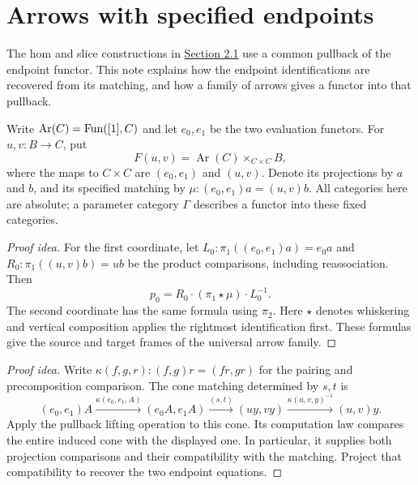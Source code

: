 \documentclass[11pt]{article}
\begin{document}
\section*{Arrows with specified endpoints}

The hom and slice constructions in \href{morphisms-and-diagrams.html}{Section 2.1}
use a common pullback of the endpoint functor. This note explains how the
endpoint identifications are recovered from its matching, and how a family
of arrows gives a functor into that pullback.

Write $\operatorname{Ar}(C)=\operatorname{Fun}([1],C)$ and let $e_0,e_1$ be the two
evaluation functors. For $u,v\colon B\to C$, put
\[
 F(u,v)=\operatorname{Ar}(C)\times_{C\times C}B,
\]
where the maps to $C\times C$ are $(e_0,e_1)$ and $(u,v)$.
Denote its projections by $a$ and $b$, and its specified matching by
$\mu\colon(e_0,e_1)a=(u,v)b$. All categories here are absolute;
a parameter category $\Gamma$ describes a functor into these fixed categories.

\begin{proof}[Proof idea]
For the first coordinate, let $L_0\colon\pi_1((e_0,e_1)a)=e_0a$
and $R_0\colon\pi_1((u,v)b)=ub$ be the product comparisons, including
reassociation. Then
\[
 p_0=R_0\cdot(\pi_1\star\mu)\cdot L_0^{-1}.
\]
The second coordinate has the same formula using $\pi_2$.
Here $\star$ denotes whiskering and vertical composition applies the
rightmost identification first. These formulas give the source and target
frames of the universal arrow family.
\end{proof}

\begin{proof}[Proof idea]
Write $\kappa(f,g,r)\colon(f,g)r=(fr,gr)$ for the pairing and
precomposition comparison. The cone matching determined by $s,t$ is
\[
 (e_0,e_1)A
 \xrightarrow{\kappa(e_0,e_1,A)}(e_0A,e_1A)
 \xrightarrow{(s,t)}(uy,vy)
 \xrightarrow{\kappa(u,v,y)^{-1}}(u,v)y.
\]
Apply the pullback lifting operation to this cone. Its computation law
compares the entire induced cone with the displayed one. In particular,
it supplies both projection comparisons and their compatibility with
the matching. Project that compatibility to recover the two endpoint equations.
\end{proof}
\end{document}
